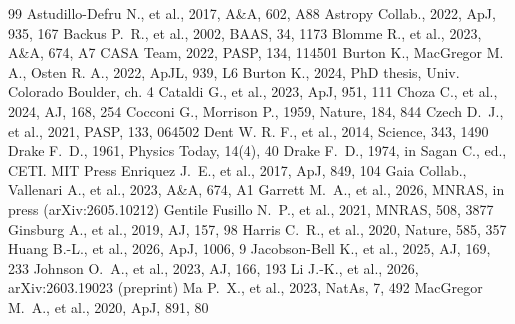 \documentclass[twocolumn,twocolappendix]{openjournal}
\begin{document}
%
%
%
%
%
\begin{thebibliography}{99}
 Astudillo-Defru N., et al., 2017, A\&A, 602, A88
 Astropy Collab., 2022, ApJ, 935, 167
 Backus P.~R., et al., 2002, BAAS, 34, 1173
 Blomme R., et al., 2023, A\&A, 674, A7
 CASA Team, 2022, PASP, 134, 114501
 Burton K., MacGregor M. A., Osten R. A., 2022, ApJL, 939, L6
 Burton K., 2024, PhD thesis, Univ. Colorado Boulder, ch. 4
 Cataldi G., et al., 2023, ApJ, 951, 111
 Choza C., et al., 2024, AJ, 168, 254
 Cocconi G., Morrison P., 1959, Nature, 184, 844
 Czech D.~J., et al., 2021, PASP, 133, 064502
 Dent W. R. F., et al., 2014, Science, 343, 1490
 Drake F.~D., 1961, Physics Today, 14(4), 40
 Drake F.~D., 1974, in Sagan C., ed., CETI. MIT Press
 Enriquez J.~E., et al., 2017, ApJ, 849, 104
 Gaia Collab., Vallenari A., et al., 2023, A\&A, 674, A1
 Garrett M.~A., et al., 2026, MNRAS, in press (arXiv:2605.10212)
 Gentile Fusillo N.~P., et al., 2021, MNRAS, 508, 3877
 Ginsburg A., et al., 2019, AJ, 157, 98
 Harris C.~R., et al., 2020, Nature, 585, 357
 Huang B.-L., et al., 2026, ApJ, 1006, 9
 Jacobson-Bell K., et al., 2025, AJ, 169, 233
 Johnson O.~A., et al., 2023, AJ, 166, 193
 Li J.-K., et al., 2026, arXiv:2603.19023 (preprint)
 Ma P.~X., et al., 2023, NatAs, 7, 492
 MacGregor M.~A., et al., 2020, ApJ, 891, 80

\end{thebibliography}
\end{document}
